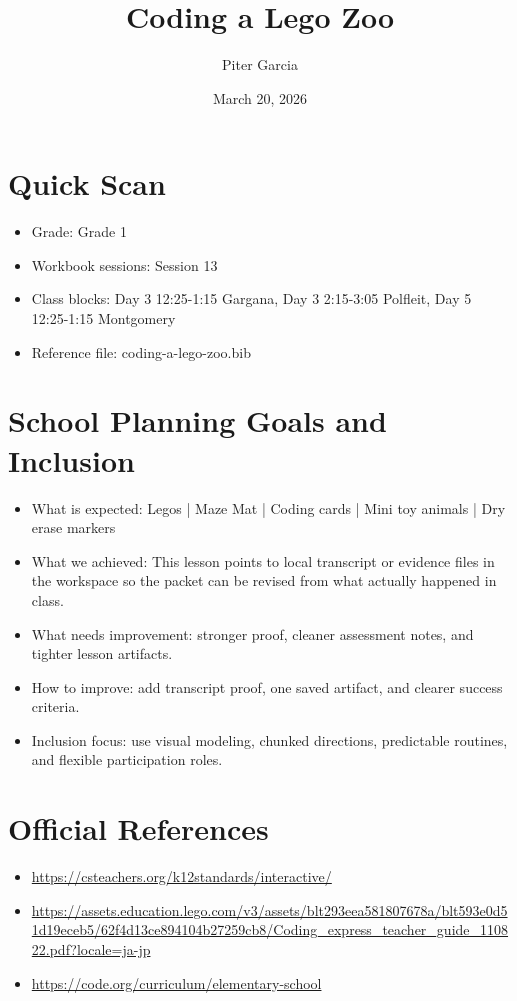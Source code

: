 \documentclass[11pt]{article}
\title{Coding a Lego Zoo}
\author{Piter Garcia}
\date{March 20, 2026}
\begin{document}
    \maketitle
    \section*{Quick Scan}
    \begin{itemize}[leftmargin=*]
    \item Grade: Grade 1
    \item Workbook sessions: Session 13
    \item Class blocks: Day 3 12:25-1:15 Gargana, Day 3 2:15-3:05 Polfleit, Day 5 12:25-1:15 Montgomery
    \item Reference file: coding-a-lego-zoo.bib
    \end{itemize}
    \section*{School Planning Goals and Inclusion}
    \begin{itemize}[leftmargin=*]
    \item What is expected: Legos | Maze Mat | Coding cards | Mini toy animals | Dry erase markers
    \item What we achieved: This lesson points to local transcript or evidence files in the workspace so the packet can be revised from what actually happened in class.
    \item What needs improvement: stronger proof, cleaner assessment notes, and tighter lesson artifacts.
    \item How to improve: add transcript proof, one saved artifact, and clearer success criteria.
    \item Inclusion focus: use visual modeling, chunked directions, predictable routines, and flexible participation roles.
    \end{itemize}
    \section*{Official References}
    \begin{itemize}[leftmargin=*]
    \item \url{https://csteachers.org/k12standards/interactive/}
\item \url{https://assets.education.lego.com/v3/assets/blt293eea581807678a/blt593e0d51d19eceb5/62f4d13ce894104b27259cb8/Coding_express_teacher_guide_110822.pdf?locale=ja-jp}
\item \url{https://code.org/curriculum/elementary-school}

    \end{itemize}
    
\end{document}
